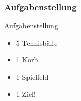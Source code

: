 \begin{frame}
    \frametitle{Aufgabenstellung}
	\begin{block}{Aufgabenstellung}
	    \begin{itemize}
	    	\item 5 Tennisbälle
	    	\item 1 Korb
		    \item 1 Spielfeld
		    \item 1 Ziel!
	    \end{itemize}
    \end{block}
\end{frame}
